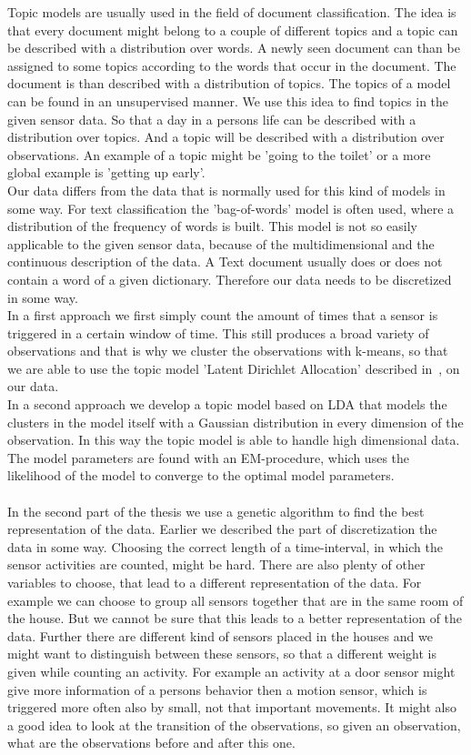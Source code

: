 \documentclass[11pt,a4paper]{article}
\begin{document}
Topic models are usually used in the field of document classification. The idea is that every document might belong to a couple of different topics and a topic can be described with a distribution over words. A newly seen document can than be assigned to some topics according to the words that occur in the document. The document is than described with a distribution of topics. The topics of a model can be found in an unsupervised manner.
We use this idea to find topics in the given sensor data. So that a day in a persons life can be described with a distribution over topics. And a topic will be described with a distribution over observations. An example of a topic might be 'going to the toilet' or a more global example is 'getting up early'.\\
Our data differs from the data that is normally used for this kind of models in some way. For text classification the 'bag-of-words' model is often used, where a distribution of the frequency of words is built. This model is not so easily applicable to the given sensor data, because of the multidimensional and the continuous description of the data. A Text document usually does or does not contain a word of a given dictionary. Therefore our data needs to be discretized in some way.\\
In a first approach we first simply count the amount of times that a sensor is triggered in a certain window of time. This still produces a broad variety of observations and that is why we cluster the observations with k-means, so that we are able to use the topic model 'Latent Dirichlet Allocation' described in~\cite{blei2003latent}, on our data.\\
In a second approach we develop a topic model based on LDA that models the clusters in the model itself with a Gaussian distribution in every dimension of the observation. In this way the topic model is able to handle high dimensional data. The model parameters are found with an EM-procedure, which uses the likelihood of the model to converge to the optimal model parameters.\\
\\
In the second part of the thesis we use a genetic algorithm to find the best representation of the data.
Earlier we described the part of discretization the data in some way. Choosing the correct length of a time-interval, in which the sensor activities are counted, might be hard. There are also plenty of other variables to choose, that lead to a different representation of the data. For example we can choose to group all sensors together that are in the same room of the house. But we cannot be sure that this leads to a better representation of the data. Further there are different kind of sensors placed in the houses and we might want to distinguish between these sensors, so that a different weight is given while counting an activity. For example an activity at a door sensor might give more information of a persons behavior then a motion sensor, which is triggered more often also by small, not that important movements. It might also a good idea to look at the transition of the observations, so given an observation, what are the observations before and after this one.\\
\end{document}
